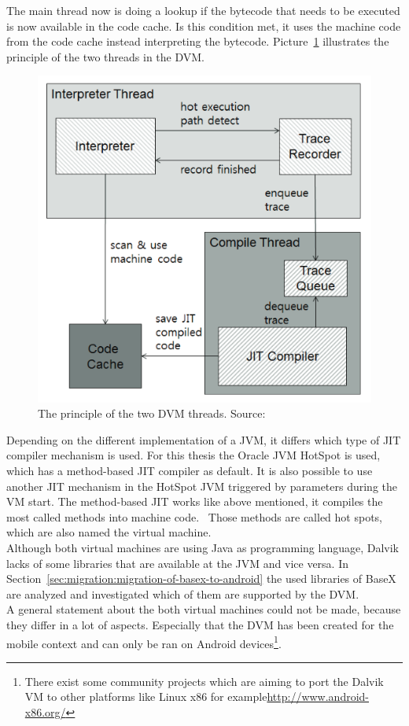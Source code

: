 The main thread now is doing a lookup if the bytecode that needs to be executed is now available in the code cache.
Is this condition met, it uses the machine code from the code cache instead interpreting the bytecode.\cite{oh2012evaluation}
Picture~\ref{fig:dvm-threads} illustrates the principle of the two threads in the DVM.\\
\begin{figure}[h]
\begin{center}
\includegraphics[scale=0.5]{images/dvm-threads.png} 
\caption{The principle of the two DVM threads. Source:\cite{oh2012evaluation}}
\label{fig:dvm-threads}
\end{center}
\end{figure}

Depending on the different implementation of a JVM, it differs which type of JIT compiler mechanism is used.
For this thesis the Oracle JVM HotSpot is used, which has a method-based JIT compiler as default.
It is also possible to use another JIT mechanism in the HotSpot JVM triggered by parameters during the VM start.
The method-based JIT works like above mentioned, it compiles the most called methods into machine code.~\cite{kotzmann2008design}
Those methods are called hot spots, which are also named the virtual machine.
\cite{paleczny2001java}
\\
Although both virtual machines are using Java as programming language, Dalvik lacks of some libraries that are available at the JVM and vice versa.
In Section~\ref{sec:migration:migration-of-basex-to-android} the used libraries of BaseX are analyzed and investigated which of them are supported by the DVM.\\
A general statement about the both virtual machines could not be made, because they differ in a lot of aspects.
Especially that the DVM has been created for the mobile context and can only be ran on Android devices\footnote{There exist some community projects which are aiming to port the Dalvik VM to other platforms like Linux x86 for example\url{http://www.android-x86.org/}}.


